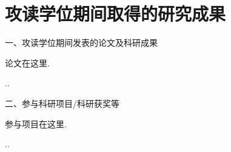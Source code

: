 \chapter*{攻读\cDegree{}学位期间取得的研究成果}



一、攻读\cDegree{}学位期间发表的论文及科研成果
\begin{publist}
	\item 论文在这里.
	
	\item ..
	
\end{publist}

二、参与科研项目/科研获奖等
\begin{publist}
	\item 参与项目在这里.
	
	\item ..
\end{publist}